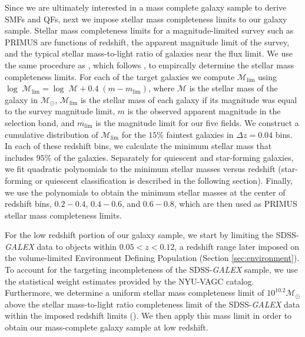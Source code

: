 \documentclass{aastex}
\begin{document}
Since we are ultimately interested in a mass complete galaxy sample to
derive SMFs and QFs, next we impose stellar mass completeness limits
to our galaxy sample.
Stellar mass completeness limits for a magnitude-limited survey such as PRIMUS are functions of redshift, the apparent magnitude limit of the survey, and the typical stellar mass-to-light ratio of galaxies near the flux limit. We use the same procedure as \cite{Moustakas:2013aa}, which follows \cite{Pozzetti:2010aa}, to empircally determine the stellar mass completeness limits. For each of the target galaxies we compute $\mathcal{M}_{\mathrm{lim}}$ using $\log \; \mathcal{M}_{\mathrm{lim}} = \log \; \mathcal{M} + 0.4\;(m - m_{\mathrm{lim}})$, where $\mathcal{M}$ is the stellar mass of the galaxy in $\mathcal{M_{\odot}}$, $\mathcal{M}_{\mathrm{lim}}$ is the stellar mass of each galaxy if its magnitude was equal to the survey magnitude limit, $m$ is the observed apparent magnitude in the selection band, and $m_{\mathrm{lim}}$ is the magnitude limit for our five fields. We construct a cumulative distribution of $\mathcal{M}_{\mathrm{lim}}$ for the $15\%$ faintest galaxies in $\Delta z=0.04$ bins. In each of these redshift bins, we calculate the minimum stellar mass that includes $95 \%$ of the galaxies. Separately for quiescent and star-forming galaxies, we fit quadratic polynomials to the minimum stellar masses versus redshift (star-forming or quiescent classification is described in the following section). Finally, we use the polynomials to obtain the minimum stellar masses at the center of redshift bins, $0.2-0.4$, $0.4-0.6$, and $0.6-0.8$, which are then used as PRIMUS stellar mass completeness limits.

For the low redshift portion of our galaxy sample, we start by limiting the SDSS-{\em GALEX} data to objects within $0.05 < z < 0.12$, a redshift range later imposed on the volume-limited Environment Defining Population (Section \ref{sec:environment}). To account for the targeting incompleteness of the SDSS-{\em GALEX} sample, we use the statistical weight estimates provided by the NYU-VAGC catalog. Furthermore, we determine a uniform stellar mass completeness limit of $10^{10.2} \mathcal{M}_{\odot}$ above the stellar mass-to-light ratio completeness limit of the SDSS-{\em GALEX} data within the imposed redshift limits (\citealt{Blanton:2005ab, Baldry:2008aa, Moustakas:2013aa}). We then apply this mass limit in order to obtain our mass-complete galaxy sample at low redshift. 
\end{document}
